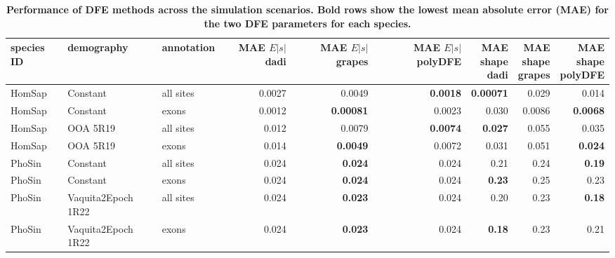 \documentclass[hidelinks]{article}
\begin{document}
\begin{table}[ht]
\centering
\small
\caption{\bf{Performance of DFE methods across the simulation scenarios}. 
Bold rows show the lowest mean absolute error (MAE) for the two DFE parameters
for each species.}
\begin{tabular}{lllrrrrrr}
\toprule
species ID & demography & annotation & \makecell{MAE \\ $E|s|$ \\ dadi} & \makecell{MAE \\ $E|s|$ \\ grapes} & \makecell{MAE \\ $E|s|$ \\ polyDFE} & \makecell{MAE \\ shape \\ dadi} & \makecell{MAE \\ shape \\ grapes} & \makecell{MAE \\ shape \\ polyDFE} \\
\midrule
HomSap & Constant & all sites & 0.0027 & 0.0049 & \bf{0.0018} & \bf{0.00071} & 0.029 & 0.014 \\
HomSap & Constant & exons & 0.0012 & \bf{0.00081} & 0.0023 & 0.030 & 0.0086 & \bf{0.0068} \\
HomSap & OOA 5R19 & all sites & 0.012 & 0.0079 & \bf{0.0074} & \bf{0.027} & 0.055 & 0.035 \\
HomSap & OOA 5R19 & exons & 0.014 & \bf{0.0049} & 0.0072 & 0.031 & 0.051 & \bf{0.024} \\
PhoSin & Constant & all sites & 0.024 & \bf{0.024} & 0.024 & 0.21 & 0.24 & \bf{0.19} \\
PhoSin & Constant & exons & 0.024 & \bf{0.024} & 0.024 & \bf{0.23} & 0.25 & 0.23 \\
PhoSin & Vaquita2Epoch 1R22 & all sites & 0.024 & \bf{0.023} & 0.024 & 0.20 & 0.23 & \bf{0.18} \\
PhoSin & Vaquita2Epoch 1R22 & exons & 0.024 & \bf{0.023} & 0.024 & \bf{0.18} & 0.23 & 0.21 \\
\bottomrule
\end{tabular}
\label{tab:dfe_table}
\end{table}
\end{document}

